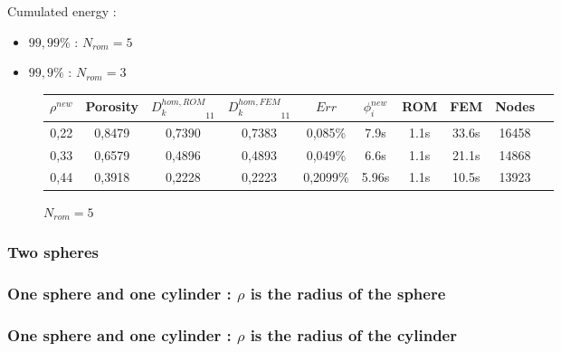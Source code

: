 \begin{multicols}{2}
Cumulated energy :

\columnbreak
\begin{itemize}
\item $99,99\%$ : $N_{rom}=5$
\item $99,9\%$ : $N_{rom}=3$
\end{itemize}
%
\end{multicols}

\ligneinter

\begin{figure}[H]%
%
\begin{center}
\begin{tabular}{|c|c||c|c||c|c||c|c||c||c|}
\hline
$\rho^{new}$&Porosity&${D_k^{hom,ROM}}_{11}$&${D_k^{hom,FEM}}_{11}$&$Err$&$\phi_i^{new}$&ROM&FEM&Nodes\\
\hline
0,22&0,8479&0,7390&0,7383&0,085\%&7.9s&1.1s&33.6s&16458\\
\hline
0,33&0,6579&0,4896&0,4893&0,049\%&6.6s&1.1s&21.1s&14868\\
\hline
0,44&0,3918&0,2228&0,2223&0,2099\%&5.96s&1.1s&10.5s&13923\\
\hline
\end{tabular}
\end{center}
\caption{$N_{rom}=5$}
%
\end{figure}
\begin{comment}
\etoile

\begin{figure}[H]%
%
\begin{center}
\begin{tabular}{|c|c||c|c||c|c||c|c||c||c|}
\hline
$\rho^{new}$&Porosity&${D_k^{hom,ROM}}_{11}$&${D_k^{hom,FEM}}_{11}$&$Err$&$\phi_i^{new}$&ROM&FEM&Nodes\\
\hline
0,22&0,9553&\textbf{0.9363}&0,9356&\textbf{0.086}\%&\textbf{5}s&$<$1s&75s&20724\\
\hline
0,33&0,8494&\textbf{0.7992}&0,7910&\textbf{0.013}\%&\textbf{4}s&$<$1s&60s&20544\\
\hline
0,44&0,6431&\textbf{0.5408}&0,5405&\textbf{0.048}\%&\textbf{4}s&$<$1s&30s&16953\\
\hline
\end{tabular}
\end{center}
\caption{$\mathbf{N_{rom}=3}$}
%
\end{figure}
\end{comment}
\subsubsection{Two spheres}

\subsubsection{One sphere and one cylinder : $\rho$ is the radius of the sphere}

\subsubsection{One sphere and one cylinder : $\rho$ is the radius of the cylinder}




